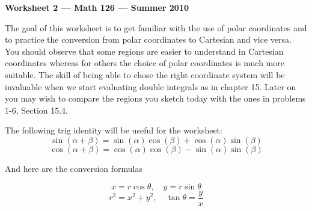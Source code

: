 \documentclass[12pt]{article}
\begin{document}
\begin{center}
{\bf Worksheet 2 --- Math 126 --- Summer 2010}
\end{center}
\noindent
The goal of this worksheet is to  get familiar with the use of polar coordinates 
and to practice the  conversion from polar coordinates to Cartesian and vice versa.   
 You should observe that some regions  are easier to understand in Cartesian coordinates whereas 
 for others the choice of polar coordinates is  much more suitable.   The skill of being 
 able to chose the right coordinate system will be invaluable when we start evaluating 
 double integrals as in chapter 15.   Later on you may wish to compare the regions you sketch today with the ones in problems 1-6, Section 15.4.
 

\vspace{0.1in}
\noindent

 The following trig identity will be useful for the worksheet: 
 $$\sin(\alpha+ \beta)= \sin(\alpha)\cos(\beta) + \cos(\alpha)\sin(\beta)$$
 $$\cos(\alpha+ \beta)= \cos(\alpha)\cos(\beta) - \sin(\alpha)\sin(\beta)$$

And here are the conversion formulas
 
$$ x = r \cos\theta, \quad y = r \sin \theta$$
$$r^2 = {x^2 + y^2}, \quad  \tan \theta = \frac{y}{x}$$
\end{document}
